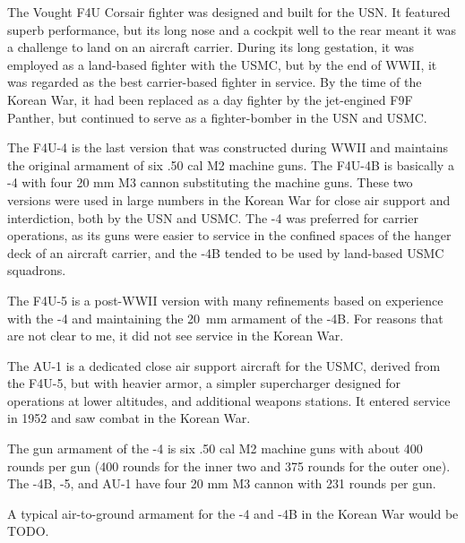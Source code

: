 
The Vought F4U Corsair fighter was designed and built for the USN. It featured superb performance, but its long nose and a cockpit well to the rear meant it was a challenge to land on an aircraft carrier. During its long gestation, it was employed as a land-based fighter with the USMC, but by the end of WWII, it was regarded as the best carrier-based fighter in service. By the time of the Korean War, it had been replaced as a day fighter by the jet-engined F9F Panther, but continued to serve as a fighter-bomber in the USN and USMC.

The F4U-4 is the last version that was constructed during WWII and maintains the original armament of six .50 cal M2 machine guns. The F4U-4B is basically a -4 with four 20 mm M3 cannon substituting the machine guns. These two versions were used in large numbers in the Korean War for close air support and interdiction, both by the USN and USMC. The -4 was preferred for carrier operations, as its guns were easier to service in the confined spaces of the hanger deck of an aircraft carrier, and the -4B tended to be used by land-based USMC squadrons.

The F4U-5 is a post-WWII version with many refinements based on experience with the -4 and maintaining the 20~mm armament of the -4B. For reasons that are not clear to me, it did not see service in the Korean War.

The AU-1 is a dedicated close air support aircraft for the USMC, derived from the F4U-5, but with heavier armor, a simpler supercharger designed for operations at lower altitudes, and additional weapons stations. It entered service in 1952 and saw combat in the Korean War.

The gun armament of the -4 is six .50 cal M2 machine guns with about 400 rounds per gun (400 rounds for the inner two and 375 rounds for the outer one). The -4B, -5, and AU-1 have four 20 mm M3 cannon with 231 rounds per gun.

A typical air-to-ground armament for the -4 and -4B in the Korean War would be TODO.

\begin{adclist}
\end{adclist}

